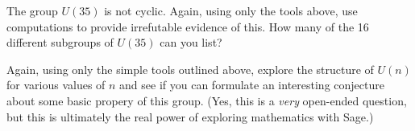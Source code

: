 \begin{sageverbatim}\end{sageverbatim}
%
%
The group $U(35)$ is not cyclic.  Again, using only the tools above, use computations to provide irrefutable evidence of this.  How many of the 16 different subgroups of $U(35)$ can you list?\par
\begin{sageverbatim}\end{sageverbatim}
%
%
Again, using only the simple tools outlined above, explore the structure of $U(n)$ for various values of $n$ and see if you can formulate an interesting conjecture about some basic propery of this group.  (Yes, this is a {\em very} open-ended question, but this is ultimately the real power of exploring mathematics with Sage.)
\begin{sageverbatim}\end{sageverbatim}
%
